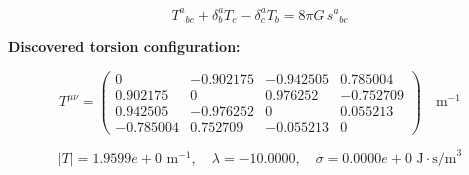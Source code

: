 
\begin{equation}
  T^a{}_{bc} + \delta^a_b T_c - \delta^a_c T_b = 8\pi G \, s^a{}_{bc}
\end{equation}

\textbf{Discovered torsion configuration:}

\begin{equation}
  T^{\mu\nu} = \begin{pmatrix}
    0 & -0.902175 & -0.942505 & 0.785004 \\
    0.902175 & 0 & 0.976252 & -0.752709 \\
    0.942505 & -0.976252 & 0 & 0.055213 \\
    -0.785004 & 0.752709 & -0.055213 & 0
  \end{pmatrix} \quad \text{m}^{-1}
\end{equation}

\begin{equation}
  |T| = 1.9599e+0 \text{ m}^{-1}, \quad
  \lambda = -10.0000, \quad
  \sigma = 0.0000e+0 \text{ J}\cdot\text{s/m}^3
\end{equation}